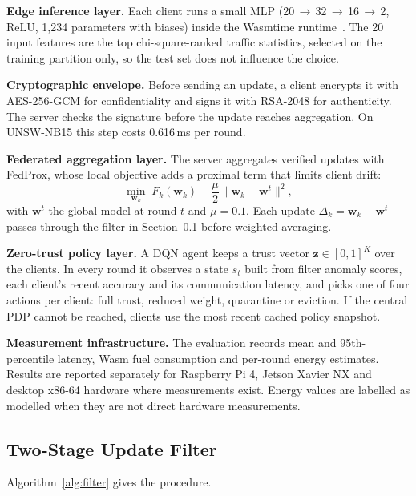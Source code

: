 \documentclass[iicol,Numbered]{sn-jnl}
\begin{document}
\textbf{Edge inference layer.} Each client runs a small MLP
(20\,$\to$\,32\,$\to$\,16\,$\to$\,2, ReLU, 1,234 parameters with biases) inside
the Wasmtime runtime~\cite{wasmtime2023}. The 20 input features are the top
chi-square-ranked traffic statistics, selected on the training partition only,
so the test set does not influence the choice.

\textbf{Cryptographic envelope.} Before sending an update, a client encrypts it
with AES-256-GCM for confidentiality and signs it with RSA-2048 for
authenticity. The server checks the signature before the update reaches
aggregation. On UNSW-NB15 this step costs 0.616\,ms per round.

\textbf{Federated aggregation layer.} The server aggregates verified updates
with FedProx, whose local objective adds a proximal term that limits client
drift:
\begin{equation}
\min_{\mathbf{w}_k}\; F_k(\mathbf{w}_k)+\frac{\mu}{2}\|\mathbf{w}_k-\mathbf{w}^t\|^2,
\label{eq:fedprox}
\end{equation}
with $\mathbf{w}^t$ the global model at round $t$ and $\mu=0.1$. Each update
$\Delta_k=\mathbf{w}_k-\mathbf{w}^t$ passes through the filter in
Section~\ref{sec:filter} before weighted averaging.

\textbf{Zero-trust policy layer.} A DQN agent keeps a trust vector
$\mathbf{z}\in[0,1]^K$ over the clients. In every round it observes a state
$s_t$ built from filter anomaly scores, each client's recent accuracy and its
communication latency, and picks one of four actions per client: full trust,
reduced weight, quarantine or eviction. If the central PDP cannot be reached,
clients use the most recent cached policy snapshot.

\textbf{Measurement infrastructure.} The evaluation records mean and
95th-percentile latency, Wasm fuel consumption and per-round energy estimates.
Results are reported separately for Raspberry Pi 4, Jetson Xavier NX and desktop
x86-64 hardware where measurements exist. Energy values are labelled as modelled
when they are not direct hardware measurements.

\subsection{Two-Stage Update Filter}\label{sec:filter}

Algorithm~\ref{alg:filter} gives the procedure.
\end{document}
